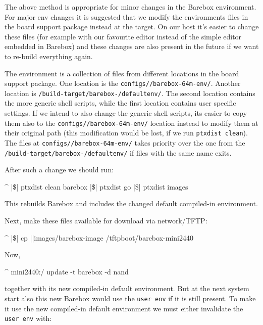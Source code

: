 The above method is appropriate for minor changes in the Barebox environment. For
major env changes it is suggested that we modify the environments files in the board
support package instead at the target. On our host it's easier to change these files
(for example with our favourite editor instead of the simple editor embedded in
Barebox) and these changes are also present in the future if we want to re-build
everything again.

The environment is a collection of files from different locations in the board
support package. One location is the \texttt{configs/\ptxdistPlatformName /barebox-64m-env/}.
Another location is \texttt{\ptxdistPlatformDir /build-target/barebox-\ptxBareboxRev /defaultenv/}.
The second location contains the more generic shell scripts, while the first
location contains user specific settings. If we intend to also change the generic shell
scripts, its easier to copy them also to the \texttt{configs/\ptxdistPlatformName /barebox-64m-env/}
location instead to modify them at their original path (this modification would
be lost, if we run \texttt{ptxdist clean}). The files at
\texttt{configs/\ptxdistPlatformName /barebox-64m-env/} takes priority over the
one from the \texttt{\ptxdistPlatformDir /build-target/barebox-\ptxBareboxRev /defaultenv/}
if files with the same name exits.

After such a change we should run:

\begin{ptxshell}[escapechar=|]{^}
|\$| ptxdist clean barebox
|\$| ptxdist go
|\$| ptxdist images
\end{ptxshell}

This rebuilds Barebox and includes the changed default compiled-in environment.

Next, make these files available for download via network/TFTP:

\begin{ptxshell}[escapechar=|]{^}
|\$| cp |\ptxdistPlatformDir |images/barebox-image /tftpboot/barebox-mini2440
\end{ptxshell}

Now,

\begin{ptxshell}[escapechar=|]{^}
mini2440:/ update -t barebox -d nand
\end{ptxshell}

together with its new compiled-in default environment. But at the next system
start also this new Barebox would use the \texttt{user env} if it is still present.
To make it use the new compiled-in default environment we must either invalidate
the \texttt{user env} with:

